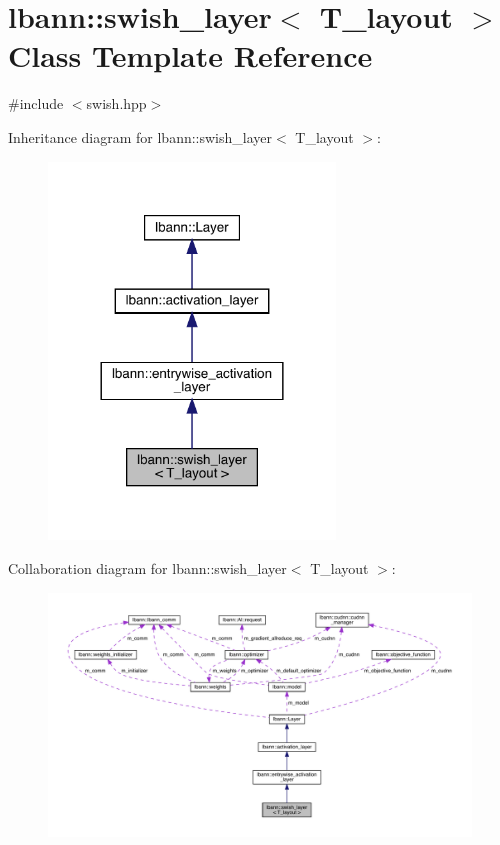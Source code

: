 \hypertarget{classlbann_1_1swish__layer}{}\section{lbann\+:\+:swish\+\_\+layer$<$ T\+\_\+layout $>$ Class Template Reference}
\label{classlbann_1_1swish__layer}


{\ttfamily \#include $<$swish.\+hpp$>$}



Inheritance diagram for lbann\+:\+:swish\+\_\+layer$<$ T\+\_\+layout $>$\+:\nopagebreak
\begin{figure}[H]
\begin{center}
\leavevmode
\includegraphics[width=216pt]{classlbann_1_1swish__layer__inherit__graph}
\end{center}
\end{figure}


Collaboration diagram for lbann\+:\+:swish\+\_\+layer$<$ T\+\_\+layout $>$\+:\nopagebreak
\begin{figure}[H]
\begin{center}
\leavevmode
\includegraphics[width=350pt]{classlbann_1_1swish__layer__coll__graph}
\end{center}
\end{figure}
